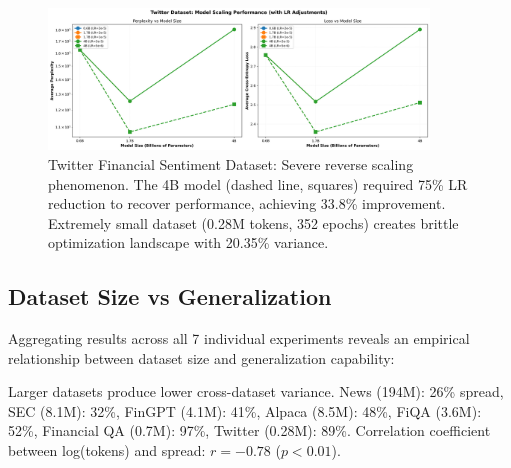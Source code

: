 \begin{figure}[h]
\centering
\includegraphics[width=0.9\textwidth]{figures/scaling_twitter.png}
\caption[Twitter Financial Sentiment Dataset: Reverse Scaling]{Twitter Financial Sentiment Dataset: Severe reverse scaling phenomenon. The 4B model (dashed line, squares) required 75\% LR reduction to recover performance, achieving 33.8\% improvement. Extremely small dataset (0.28M tokens, 352 epochs) creates brittle optimization landscape with 20.35\% variance.}
\label{fig:scaling_twitter}
\end{figure}





\subsection{Dataset Size vs Generalization}

Aggregating results across all 7 individual experiments reveals an empirical relationship between dataset size and generalization capability:

Larger datasets produce lower cross-dataset variance. News (194M): 26\% spread, SEC (8.1M): 32\%, FinGPT (4.1M): 41\%, Alpaca (8.5M): 48\%, FiQA (3.6M): 52\%, Financial QA (0.7M): 97\%, Twitter (0.28M): 89\%. Correlation coefficient between log(tokens) and spread: $r = -0.78$ ($p < 0.01$).

